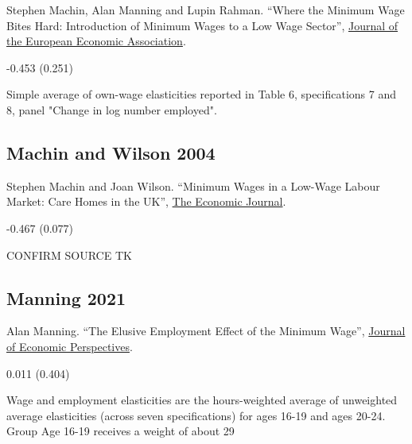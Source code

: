 \noindent Stephen Machin, Alan Manning and Lupin Rahman. ``Where the Minimum Wage Bites Hard: Introduction of Minimum Wages to a Low Wage Sector'', \href{https://doi.org/10.1162/154247603322256792}{Journal of the European Economic Association}.

\vspace{0.7em}

 -0.453 (0.251)

\vspace{0.7em}

 Simple average of own-wage elasticities reported in Table 6, specifications 7 and 8, panel "Change in log number employed".

\subsection*{Machin and Wilson 2004}
\vspace{-0.7em}

\noindent Stephen Machin and Joan Wilson. ``Minimum Wages in a Low-Wage Labour Market: Care Homes in the UK'', \href{https://doi.org/10.1111/j.0013-0133.2003.00199.x}{The Economic Journal}.

\vspace{0.7em}

 -0.467 (0.077)

\vspace{0.7em}

 CONFIRM SOURCE TK

\subsection*{Manning 2021}
\vspace{-0.7em}

\noindent Alan Manning. ``The Elusive Employment Effect of the Minimum Wage'', \href{https://doi.org/10.1257/jep.35.1.3}{Journal of Economic Perspectives}.

\vspace{0.7em}

 0.011 (0.404)

\vspace{0.7em}

 Wage and employment elasticities are the hours-weighted average of unweighted average elasticities (across seven specifications) for ages 16-19 and ages 20-24. Group Age 16-19 receives a weight of about 29%

